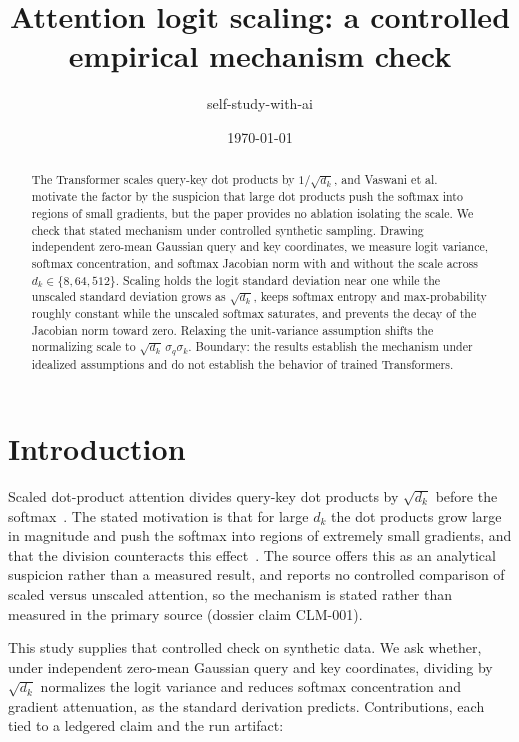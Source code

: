 \documentclass{article}
\title{Attention logit scaling: a controlled empirical mechanism check}
\author{self-study-with-ai}
\date{\today}
\begin{document}
\maketitle

\begin{abstract}
The Transformer scales query-key dot products by $1/\sqrt{d_k}$, and
Vaswani et al.~\citep{vaswani2017attention} motivate the factor by the
suspicion that large dot products push the softmax into regions of small
gradients, but the paper provides no ablation isolating the scale. We check
that stated mechanism
under controlled synthetic sampling. Drawing independent zero-mean Gaussian
query and key coordinates, we measure logit variance, softmax concentration,
and softmax Jacobian norm with and without the scale across
$d_k \in \{8, 64, 512\}$. Scaling holds the logit standard deviation near one
while the unscaled standard deviation grows as $\sqrt{d_k}$, keeps softmax
entropy and max-probability roughly constant while the unscaled softmax
saturates, and prevents the decay of the Jacobian norm toward zero. Relaxing
the unit-variance assumption shifts the normalizing scale to
$\sqrt{d_k}\,\sigma_q\sigma_k$. Boundary: the results establish the mechanism
under idealized assumptions and do not establish the behavior of trained
Transformers.
\end{abstract}

\section{Introduction}

Scaled dot-product attention divides query-key dot products by $\sqrt{d_k}$
before the softmax~\citep{vaswani2017attention}. The stated motivation is that
for large $d_k$ the dot products grow large in magnitude and push the softmax
into regions of extremely small gradients, and that the division counteracts
this effect~\citep{vaswani2017attention}. The source offers this as an
analytical suspicion rather than a measured result, and reports no controlled
comparison of scaled versus unscaled attention, so the mechanism is stated
rather than measured in the primary source (dossier claim CLM-001).

This study supplies that controlled check on synthetic data. We ask whether,
under independent zero-mean Gaussian query and key coordinates, dividing by
$\sqrt{d_k}$ normalizes the logit variance and reduces softmax concentration
and gradient attenuation, as the standard derivation predicts. Contributions,
each tied to a ledgered claim and the run artifact:
\end{document}
